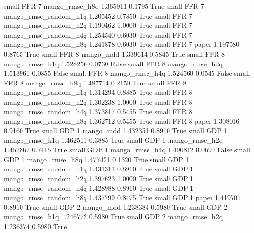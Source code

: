      small      FFR                 7        mango_rmse_h8q   1.365911      0.1795    True
     small      FFR                 7 mango_rmse_random_h1q   1.205452      0.7850    True
     small      FFR                 7 mango_rmse_random_h2q   1.190462      1.0000    True
     small      FFR                 7 mango_rmse_random_h4q   1.254540      0.6030    True
     small      FFR                 7 mango_rmse_random_h8q   1.241878      0.6030    True
     small      FFR                 7                 paper   1.197580      0.8765    True
     small      FFR                 8             mango_mdd   1.339614      0.5845    True
     small      FFR                 8        mango_rmse_h1q   1.528256      0.0730   False
     small      FFR                 8        mango_rmse_h2q   1.513961      0.0855   False
     small      FFR                 8        mango_rmse_h4q   1.524560      0.0545   False
     small      FFR                 8        mango_rmse_h8q   1.487714      0.2150    True
     small      FFR                 8 mango_rmse_random_h1q   1.314294      0.8885    True
     small      FFR                 8 mango_rmse_random_h2q   1.302238      1.0000    True
     small      FFR                 8 mango_rmse_random_h4q   1.373817      0.5455    True
     small      FFR                 8 mango_rmse_random_h8q   1.362712      0.5455    True
     small      FFR                 8                 paper   1.308016      0.9160    True
     small      GDP                 1             mango_mdd   1.432351      0.8910    True
     small      GDP                 1        mango_rmse_h1q   1.462511      0.3885    True
     small      GDP                 1        mango_rmse_h2q   1.452867      0.7415    True
     small      GDP                 1        mango_rmse_h4q   1.490812      0.0690   False
     small      GDP                 1        mango_rmse_h8q   1.477421      0.1320    True
     small      GDP                 1 mango_rmse_random_h1q   1.431311      0.8910    True
     small      GDP                 1 mango_rmse_random_h2q   1.397623      1.0000    True
     small      GDP                 1 mango_rmse_random_h4q   1.428988      0.8910    True
     small      GDP                 1 mango_rmse_random_h8q   1.437799      0.8475    True
     small      GDP                 1                 paper   1.419701      0.8910    True
     small      GDP                 2             mango_mdd   1.238384      0.5980    True
     small      GDP                 2        mango_rmse_h1q   1.246772      0.5980    True
     small      GDP                 2        mango_rmse_h2q   1.236374      0.5980    True
